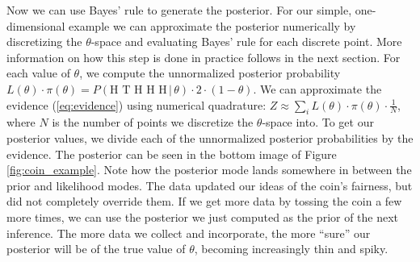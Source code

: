 \documentclass[12pt, a4paper]{report}
\begin{document}
Now we can use Bayes' rule to generate the posterior.
For our simple, one-dimensional example we can approximate the posterior numerically by discretizing the $\theta$-space and evaluating Bayes' rule for each discrete point.
More information on how this step is done in practice follows in the next section.
For each value of $\theta$, we compute the unnormalized posterior probability $L(\theta) \cdot \pi(\theta) = P(\textrm{H T H H H} \, | \, \theta) \cdot 2 \cdot (1 - \theta)$.
We can approximate the evidence (\ref{eq:evidence}) using numerical quadrature: $Z \approx \sum_{i} L(\theta) \cdot \pi(\theta) \cdot \frac{1}{N}$, where $N$ is the number of points we discretize the $\theta$-space into.
To get our posterior values, we divide each of the unnormalized posterior probabilities by the evidence.
The posterior can be seen in the bottom image of Figure \ref{fig:coin_example}.
Note how the posterior mode lands somewhere in between the prior and likelihood modes.
The data updated our ideas of the coin's fairness, but did not completely override them.
If we get more data by tossing the coin a few more times, we can use the posterior we just computed as the prior of the next inference.
The more data we collect and incorporate, the more ``sure'' our posterior will be of the true value of $\theta$, becoming increasingly thin and spiky.
\end{document}
